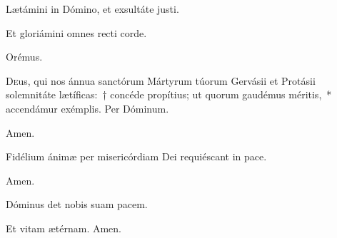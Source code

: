     
  \vv  Lætámini in Dómino, et exsultáte justi.
    
\rr Et gloriámini omnes recti corde.

Orémus.

\lettrine{D}{e}us, qui nos ánnua sanctórum Mártyrum túorum Gervásii et Protásii solemnitáte lætíficas:~† concéde propítius; ut quorum gaudémus méritis,~* accendámur exémplis. Per Dóminum.

\rr Amen.
    
   
  \vv Fidélium ánimæ per misericórdiam Dei requiéscant in pace.
  
  \rr Amen.
  
  
  \secreto
  
\vv Dóminus det nobis suam pacem.
  
\rr Et vitam ætérnam. Amen.

